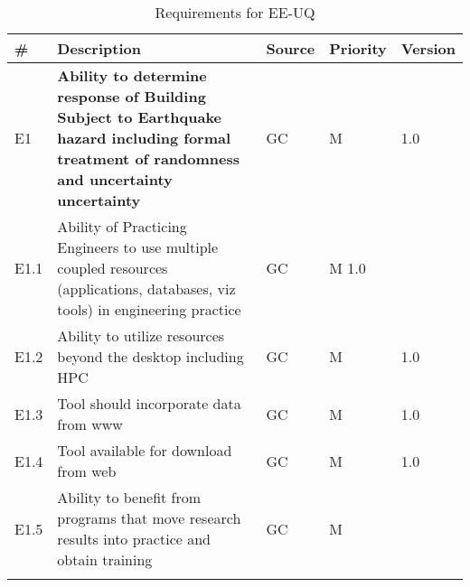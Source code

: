 \begin{longtable}{| p{} | p{} | p{} | p{} |  p{} |}

  \caption{Requirements for EE-UQ}
  \label{tab:featureRequirements}    
     \\
   \hline
\rowcolor{lightgray}

      \# & Description & Source & Priority & Version \\ \hline
      E1 & \textbf{Ability to determine response of Building Subject to Earthquake hazard including formal treatment of randomness and uncertainty uncertainty} & GC & M  & 1.0  \\ \hline
 E1.1 & Ability of Practicing Engineers to use multiple coupled resources (applications, databases, viz tools) in engineering practice & GC & M 1.0 & \\ \hline
E1.2 & Ability to utilize resources beyond the desktop including HPC & GC & M & 1.0 \\ \hline
E1.3 & Tool should incorporate data from www & GC & M & 1.0 \\ \hline
E1.4 & Tool available for download from web & GC & M & 1.0 \\ \hline
E1.5 & Ability to benefit from programs that move research results into practice and obtain training & GC & M & \\ \hhline{=====}


\end{longtable}
